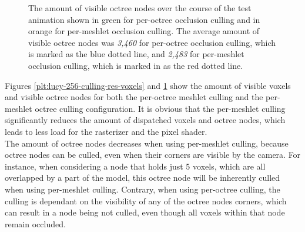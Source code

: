   \begin{figure}[h]            %
    \begin{center}
      \caption{The amount of visible octree nodes over the course of the test animation shown in green for 
      per-octree occlusion culling and in orange for per-meshlet occlusion culling. 
      The average amount of visible octree nodes was \emph{3,460} for per-octree occlusion culling, which is 
      marked as the blue dotted line, and \emph{2,483} for per-meshlet occlusion culling, which is marked in 
      as the red dotted line.}
      \label{plt:lucy-256-culling-res-nodes}
    \end{center}
  \end{figure}


\noindent
Figures \ref{plt:lucy-256-culling-res-voxels} and \ref{plt:lucy-256-culling-res-nodes} show the 
amount of visible voxels and visible octree nodes for both the per-octree meshlet culling and the 
per-meshlet octree culling configuration. It is obvious that the per-meshlet culling significantly 
reduces the amount of dispatched voxels and octree nodes, which leads to less load for the rasterizer 
and the pixel shader. \\

\noindent
The amount of octree nodes decreases when using per-meshlet culling, because octree nodes can be culled,
even when their corners are visible by the camera. For instance, when considering a node that holds just 
5 voxels, which are all overlapped by a part of the model, this octree node will be inherently culled when 
using per-meshlet culling. Contrary, when using per-octree culling, the culling is dependant on the 
visibility of any of the octree nodes corners, which can result in a node being not culled, even though all 
voxels within that node remain occluded. \\

